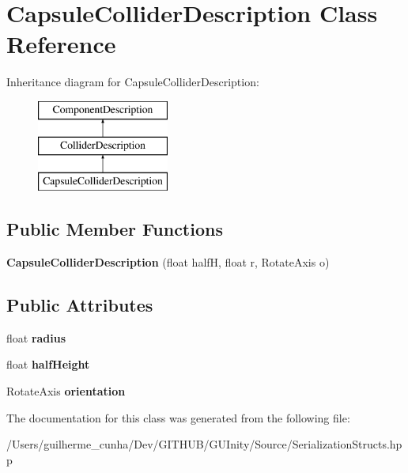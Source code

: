 \hypertarget{class_capsule_collider_description}{}\section{Capsule\+Collider\+Description Class Reference}
\label{class_capsule_collider_description}
Inheritance diagram for Capsule\+Collider\+Description\+:\begin{figure}[H]
\begin{center}
\leavevmode
\includegraphics[height=3.000000cm]{class_capsule_collider_description}
\end{center}
\end{figure}
\subsection*{Public Member Functions}
\begin{DoxyCompactItemize}
\item 
\hypertarget{class_capsule_collider_description_a6f82452c0bf8074baf06ee2111e25e34}{}{\bfseries Capsule\+Collider\+Description} (float half\+H, float r, Rotate\+Axis o)\label{class_capsule_collider_description_a6f82452c0bf8074baf06ee2111e25e34}

\end{DoxyCompactItemize}
\subsection*{Public Attributes}
\begin{DoxyCompactItemize}
\item 
\hypertarget{class_capsule_collider_description_af13d45def5b1df197f2c86f32aad1e42}{}float {\bfseries radius}\label{class_capsule_collider_description_af13d45def5b1df197f2c86f32aad1e42}

\item 
\hypertarget{class_capsule_collider_description_a77ea825d23223c4b213a71bee6734622}{}float {\bfseries half\+Height}\label{class_capsule_collider_description_a77ea825d23223c4b213a71bee6734622}

\item 
\hypertarget{class_capsule_collider_description_af0de44deca178f669648f9de7dd271c7}{}Rotate\+Axis {\bfseries orientation}\label{class_capsule_collider_description_af0de44deca178f669648f9de7dd271c7}

\end{DoxyCompactItemize}


The documentation for this class was generated from the following file\+:\begin{DoxyCompactItemize}
\item 
/\+Users/guilherme\+\_\+cunha/\+Dev/\+G\+I\+T\+H\+U\+B/\+G\+U\+Inity/\+Source/Serialization\+Structs.\+hpp\end{DoxyCompactItemize}
